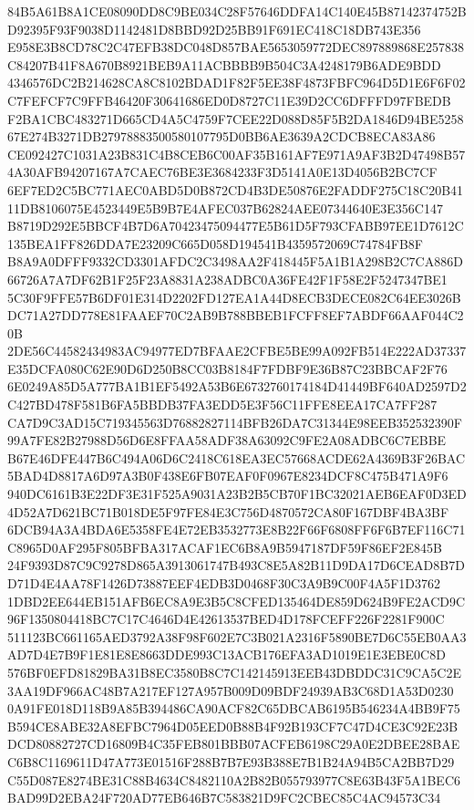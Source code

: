 \documentclass[UTF8,fontset=fandol,zihao=-4,a4paper]{ctexart}
\begin{document}
{{84B5A61B8A1CE08090DD8C9BE034C28F57646DDFA14C140E45B87142374752BD92395F93F9038D1142481D8BBD92D25BB91F691EC418C18DB743E356
E958E3B8CD78C2C47EFB38DC048D857BAE5653059772DEC897889868E257838C84207B41F8A670B8921BEB9A11ACBBBB9B504C3A4248179B6ADE9BDD
4346576DC2B214628CA8C8102BDAD1F82F5EE38F4873FBFC964D5D1E6F6F02C7FEFCF7C9FFB46420F30641686ED0D8727C11E39D2CC6DFFFD97FBEDB
F2BA1CBC483271D665CD4A5C4759F7CEE22D088D85F5B2DA1846D94BE525867E274B3271DB27978883500580107795D0BB6AE3639A2CDCB8ECA83A86
CE092427C1031A23B831C4B8CEB6C00AF35B161AF7E971A9AF3B2D47498B574A30AFB94207167A7CAEC76BE3E3684233F3D5141A0E13D4056B2BC7CF
6EF7ED2C5BC771AEC0ABD5D0B872CD4B3DE50876E2FADDF275C18C20B4111DB8106075E4523449E5B9B7E4AFEC037B62824AEE07344640E3E356C147
B8719D292E5BBCF4B7D6A70423475094477E5B61D5F793CFABB97EE1D7612C135BEA1FF826DDA7E23209C665D058D194541B4359572069C74784FB8F
B8A9A0DFFF9332CD3301AFDC2C3498AA2F418445F5A1B1A298B2C7CA886D66726A7A7DF62B1F25F23A8831A238ADBC0A36FE42F1F58E2F5247347BE1
5C30F9FFE57B6DF01E314D2202FD127EA1A44D8ECB3DECE082C64EE3026BDC71A27DD778E81FAAEF70C2AB9B788BBEB1FCFF8EF7ABDF66AAF044C20B
2DE56C44582434983AC94977ED7BFAAE2CFBE5BE99A092FB514E222AD37337E35DCFA080C62E90D6D250B8CC03B8184F7FDBF9E36B87C23BBCAF2F76
6E0249A85D5A777BA1B1EF5492A53B6E6732760174184D41449BF640AD2597D2C427BD478F581B6FA5BBDB37FA3EDD5E3F56C11FFE8EEA17CA7FF287
CA7D9C3AD15C719345563D76882827114BFB26DA7C31344E98EEB352532390F99A7FE82B27988D56D6E8FFAA58ADF38A63092C9FE2A08ADBC6C7EBBE
B67E46DFE447B6C494A06D6C2418C618EA3EC57668ACDE62A4369B3F26BAC5BAD4D8817A6D97A3B0F438E6FB07EAF0F0967E8234DCF8C475B471A9F6
940DC6161B3E22DF3E31F525A9031A23B2B5CB70F1BC32021AEB6EAF0D3ED4D52A7D621BC71B018DE5F97FE84E3C756D4870572CA80F167DBF4BA3BF
6DCB94A3A4BDA6E5358FE4E72EB3532773E8B22F66F6808FF6F6B7EF116C71C8965D0AF295F805BFBA317ACAF1EC6B8A9B5947187DF59F86EF2E845B
24F9393D87C9C9278D865A3913061747B493C8E5A82B11D9DA17D6CEAD8B7DD71D4E4AA78F1426D73887EEF4EDB3D0468F30C3A9B9C00F4A5F1D3762
1DBD2EE644EB151AFB6EC8A9E3B5C8CFED135464DE859D624B9FE2ACD9C96F1350804418BC7C17C4646D4E42613537BED4D178FCEFF226F2281F900C
511123BC661165AED3792A38F98F602E7C3B021A2316F5890BE7D6C55EB0AA3AD7D4E7B9F1E81E8E8663DDE993C13ACB176EFA3AD1019E1E3EBE0C8D
576BF0EFD81829BA31B8EC3580B8C7C142145913EEB43DBDDC31C9CA5C2E3AA19DF966AC48B7A217EF127A957B009D09BDF24939AB3C68D1A53D0230
0A91FE018D118B9A85B394486CA90ACF82C65DBCAB6195B546234A4BB9F75B594CE8ABE32A8EFBC7964D05EED0B88B4F92B193CF7C47D4CE3C92E23B
DCD80882727CD16809B4C35FEB801BBB07ACFEB6198C29A0E2DBEE28BAEC6B8C1169611D47A773E01516F288B7B7E93B388E7B1B24A94B5CA2BB7D29
C55D087E8274BE31C88B4634C8482110A2B82B055793977C8E63B43F5A1BEC6BAD99D2EBA24F720AD77EB646B7C583821D9FC2CBEC85C4AC94573C34
}}
\end{document}
